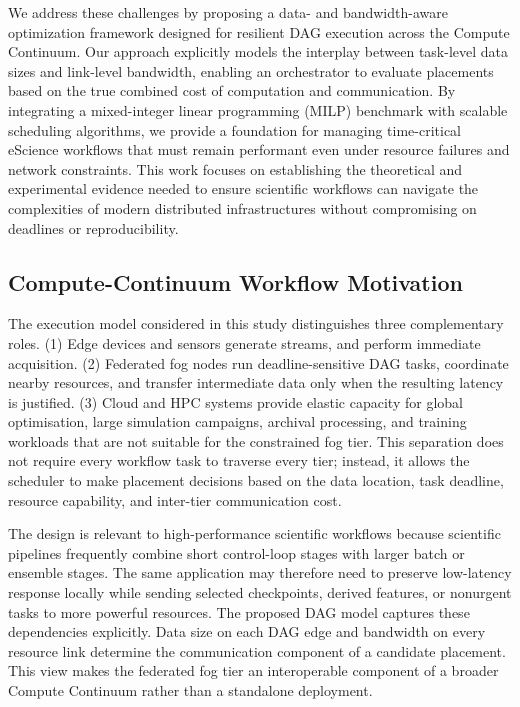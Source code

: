We address these challenges by proposing a data- and bandwidth-aware optimization framework designed for resilient DAG execution across the Compute Continuum. Our approach explicitly models the interplay between task-level data sizes and link-level bandwidth, enabling an orchestrator to evaluate placements based on the true combined cost of computation and communication. By integrating a mixed-integer linear programming (MILP) benchmark with scalable scheduling algorithms, we provide a foundation for managing time-critical eScience workflows that must remain performant even under resource failures and network constraints. This work focuses on establishing the theoretical and experimental evidence needed to ensure scientific workflows can navigate the complexities of modern distributed infrastructures without compromising on deadlines or reproducibility.

\subsection{Compute-Continuum Workflow Motivation}

The execution model considered in this study distinguishes three complementary roles. (1) Edge devices and sensors generate streams, and perform immediate acquisition. (2) Federated fog nodes run deadline-sensitive DAG tasks, coordinate nearby resources, and transfer intermediate data only when the resulting latency is justified. (3) Cloud and HPC systems provide elastic capacity for global optimisation, large simulation campaigns, archival processing, and training workloads that are not suitable for the constrained fog tier. This separation does not require every workflow task to traverse every tier; instead, it allows the scheduler to make placement decisions based on the data location, task deadline, resource capability, and inter-tier communication cost.

The design is relevant to high-performance scientific workflows because scientific pipelines frequently combine short control-loop stages with larger batch or ensemble stages. The same application may therefore need to preserve low-latency response locally while sending selected checkpoints, derived features, or nonurgent tasks to more powerful resources. The proposed DAG model captures these dependencies explicitly. Data size on each DAG edge and bandwidth on every resource link determine the communication component of a candidate placement. This view makes the federated fog tier an interoperable component of a broader Compute Continuum rather than a standalone deployment.


